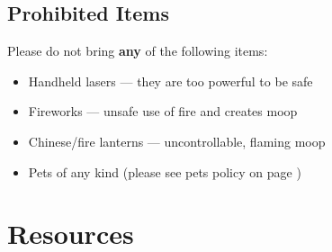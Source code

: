 \subsection*{Prohibited Items} %
Please do not bring \textbf{any} of the following items:

\begin{multicols}{2}
\begin{itemize}[noitemsep]
	\item Handheld lasers --- they are too powerful to be safe
    \item Fireworks --- unsafe use of fire and creates \gls{moop}
    \item Chinese/fire lanterns --- uncontrollable, flaming \gls{moop} 
    \item Pets of any kind (please see pets policy on page \pageref{sub:nopets})
\end{itemize}
\end{multicols}

\clearpage
\section*{Resources}

